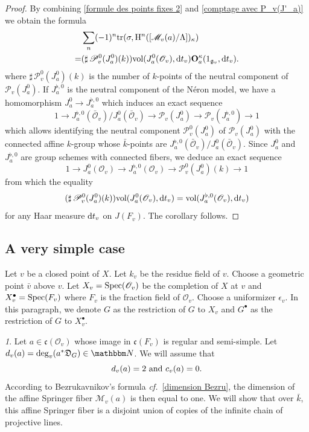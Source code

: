 \documentclass[12pt,english]{smfart}
\numberwithin{equation}{subsection}
\theoremstyle{remark}
\newtheorem{numero}[equation]{}
\newcommand\calP{{\mathscr P}}
\newcommand\calM{{\mathscr M}}
\newcommand\calO{{\mathscr O}}
\newcommand\frakg{{\mathfrak g}}
\newcommand\frakc{{\mathfrak c}}
\newcommand\NN{{\mathbbm N}}
\newcommand\rmH{{\rm H}}
\newcommand\tr{{\rm tr}}
\newcommand\Spec{{\rm Spec}}
\newcommand\cf{{\it cf.\ }}
\newcommand\discrim{\mathfrak D}
\begin{document}
\begin{proof}
By combining \ref{formule des points fixes 2} and \ref{comptage
avec P_v(J'_a)} we obtain the formula
\begin{eqnarray*}
&\sum_n (-1)^n \tr(\sigma, \rmH^n([\calM_v(a)/\Lambda])_\kappa)\\
=&({\sharp\,}\calP_v^0(J_a^0)(k)) {\rm vol}(J_a^0(\calO_v) ,{\rm d}t_v) {\bf
O}^\kappa_a(1_{\frakg_v},{\rm d}t_v).
\end{eqnarray*}
where ${\sharp\,} \calP_v^0(J_a^0)(k)$ is the number of $k$-points of the
neutral component of $\calP_v(J_a^0)$. If $J_a^{\flat,0}$ is the
neutral component of the N\'eron model, we have a homomorphism
$J_a^0 \rightarrow J_a^{\flat,0}$ which induces an exact sequence
$$1 \rightarrow J_a^{\flat,0}(\bar\calO_v)/J_a^0(\bar\calO_v) \rightarrow \calP_v(J_a^0)
\rightarrow \calP_v(J_a^{\flat,0}) \rightarrow 1
$$
which allows identifying the neutral component $\calP_v^0(J_a^0)$ of
$\calP_v(J_a^0)$ with the connected affine $k$-group whose $\bar
k$-points are $ J_a^{\flat,0}(\bar\calO_v)/J_a^0(\bar\calO_v)$. Since
$J_a^0$ and $J_a^{\flat,0}$ are group schemes with connected
fibers, we deduce an exact sequence
$$1 \rightarrow J_a^0(\calO_v) \rightarrow J_a^{\flat,0}(\calO_v) \rightarrow
\calP_v^0(J_a^0)(k) \rightarrow 1$$ from which the equality
$$({\sharp\,} \calP_v^0(J_a^0)(k))
{\rm vol}(J_a^0(\calO_v) ,{\rm d}t_v) = {\rm vol}(J_a^{\flat,0}(\calO_v)
,{\rm d}t_v) $$ for any Haar measure ${\rm d}t_v$ on
$J(F_v)$. The corollary follows.
\end{proof}


\subsection{A very simple case}
\label{subsection : fibre simple}

Let $v$ be a closed point of $X$. Let $k_v$ be the residue field of $v$.
Choose a geometric point $\bar v$ above $v$. Let
$X_v=\Spec(\calO_v)$ be the completion of $X$ at $v$ and
$X_v^\bullet=\Spec(F_v)$ where $F_v$ is the fraction field of
$\calO_v$. Choose a uniformizer $\epsilon_v$. In this paragraph,
we denote $G$ as the restriction of $G$ to $X_v$ and $G^\bullet$ as the
restriction of $G$ to $X_v^\bullet$.


\begin{numero}
Let $a\in \frakc(\calO_v)$ whose image in $\frakc(F_v)$ is regular
and semi-simple. Let $d_v(a)={\rm deg}_v (a^* \discrim_G)\in \NN$. We
will assume that
$$d_v(a) =2\ {\rm and}\ c_v(a)=0.$$
According to Bezrukavnikov's formula \cf \ref{dimension Bezru}, the
dimension of the affine Springer fiber $\calM_v(a)$ is then equal to
one. We will show that over $\bar k$, this affine Springer fiber
is a disjoint union of copies of the infinite chain of projective
lines.
\end{numero}
\end{document}
